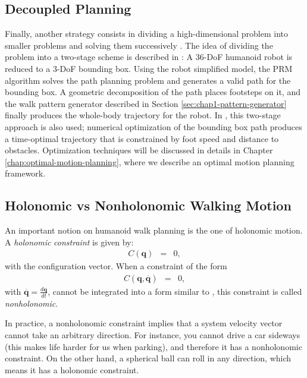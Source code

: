 \subsection{Decoupled Planning}
\label{subsec:chap1-bounding-box}

Finally, another strategy consists in dividing a high-dimensional
problem into smaller problems and solving them successively
\cite{zhan09}. The idea of dividing the problem into a two-stage
scheme is described in \cite{yosh08}: A 36-DoF humanoid robot is
reduced to a 3-DoF bounding box. Using the robot simplified model, the
PRM algorithm solves the path planning problem and generates a valid
path for the bounding box. A geometric decomposition of the path
places footsteps on it, and the walk pattern generator described in
Section \ref{sec:chap1-pattern-generator} finally produces the
whole-body trajectory for the robot. In \cite{moul10}, this two-stage
approach is also used; numerical optimization of the bounding box path
produces a time-optimal trajectory that is constrained by foot speed
and distance to obstacles. Optimization techniques will be discussed
in details in Chapter \ref{chap:optimal-motion-planning}, where we
describe an optimal motion planning framework.

\subsection{Holonomic vs Nonholonomic Walking Motion}
\label{subsec:chap1-holonomic}

An important notion on humanoid walk planning is the one of holonomic
motion.
A \emph{holonomic} \emph{constraint} is given by:
\begin{eqnarray} C(\mathbf{q}) & = & 0,
  \label{eq:chap1-holonomic_constraint}
\end{eqnarray}
with \config{} the configuration vector. When a constraint of the form
\begin{eqnarray}
  C(\mathbf{q,}\overset{.}{\mathbf{q}}) & = & 0,
\end{eqnarray}
with $\mathbf{\overset{.}{\mathbf{q}}=}\frac{d\mathbf{q}}{dt}$, cannot
be integrated into a form similar to ,
this constraint is called \emph{nonholonomic}.

In practice, a nonholonomic constraint implies that a system velocity
vector cannot take an arbitrary direction. For instance, you cannot
drive a car sideways (this makes life harder for us when parking), and
therefore it has a nonholonomic constraint. On the other hand, a
spherical ball can roll in any direction, which means it has a
holonomic constraint.

